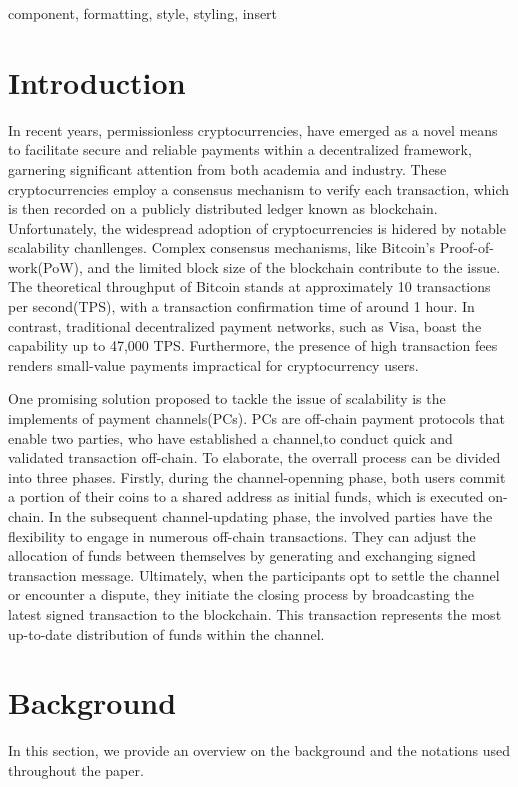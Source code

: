 \documentclass[conference]{IEEEtran}
\begin{document}
\begin{IEEEkeywords}
component, formatting, style, styling, insert
\end{IEEEkeywords}

\section{Introduction}
In recent years, permissionless cryptocurrencies, have emerged as a novel means to facilitate secure
and reliable payments within a decentralized framework, garnering significant attention from both academia and industry. 
These cryptocurrencies employ a consensus mechanism to verify each transaction, which is
then recorded on a publicly distributed ledger known as blockchain. Unfortunately, 
the widespread adoption of cryptocurrencies is hidered by notable scalability chanllenges. Complex consensus mechanisms, like Bitcoin's Proof-of-work(PoW), 
and the limited block size of the blockchain contribute to the issue. The theoretical
throughput of Bitcoin stands at approximately 10 transactions per second(TPS), with a transaction confirmation time of 
around 1 hour. In contrast, traditional decentralized payment networks, 
such as Visa, boast the capability up to 47,000 TPS. Furthermore, the presence of high transaction fees renders small-value 
payments impractical for cryptocurrency users.

One promising solution proposed to tackle the issue of scalability is the implements of payment channels(PCs).
PCs are off-chain payment protocols that enable two parties, who have established a channel,to conduct quick and
validated transaction off-chain. To elaborate, the overrall process can be divided into three phases. Firstly, 
during the channel-openning phase, both users commit a portion of their coins to a shared address as
initial funds, which is executed on-chain. In the subsequent channel-updating phase, the involved parties have
the flexibility to engage in numerous off-chain transactions. They can adjust the allocation of funds between themselves
by generating and exchanging signed transaction message. Ultimately, when the participants opt to settle the 
channel or encounter a dispute, they initiate the closing process by broadcasting the latest signed transaction
to the blockchain. This transaction represents the most up-to-date distribution of funds within the channel.

\section{Background}
In this section, we provide an overview on the background and the
notations used throughout the paper.
\end{document}
